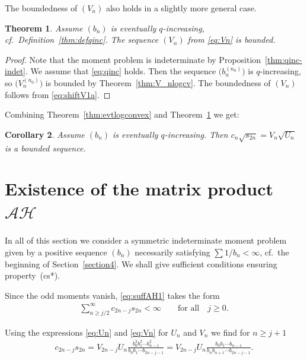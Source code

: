 \documentclass[11pt]{article}
\numberwithin{equation}{section}
\newtheorem{thm}{Theorem}[section]
\newtheorem{cor}[thm]{Corollary}
{ \theoremstyle{definition}
\newtheorem{defn}[thm]{Definition}
\newtheorem{ex}[thm]{Example}
 \newtheorem{rem}[thm]{Remark}}
\begin{document}
The boundedness of $(V_n)$ also holds in a slightly more general case.

\begin{thm}\label{thm:Vevtlogconv} Assume $(b_n)$ is eventually $q$-increasing, cf.\ Definition~{\rm \ref{thm:defqinc}}. The sequence $(V_n)$ from \eqref{eq:Vn} is bounded.
\end{thm}

\begin{proof} Note that the moment problem is indeterminate by Proposition~\ref{thm:qinc-indet}. We assume that \eqref{eq:qinc} holds. Then the sequence $\big(b_n^{(n_0)}\big)$ is $q$-increasing, so $\big(V_n^{(n_0)}\big)$ is bounded by Theorem~\ref{thm:V_nlogcv}. The boundedness of $(V_n)$ follows from \eqref{eq:shiftV1a}.
\end{proof}

Combining Theorem~\ref{thm:evtlogconvex} and Theorem~\ref{thm:Vevtlogconv} we get:

\begin{cor}\label{thm:VnsqrtUn} Assume $(b_n)$ is eventually $q$-increasing. Then $c_n\sqrt{s_{2n}}=V_n\sqrt{U_n}$ is a bounded sequence.
\end{cor}

\setcounter{section}{4}
\setcounter{subsection}{0}
\setcounter{subsubsection}{0}
\setcounter{thm}{11}
\setcounter{equation}{29}
\section[Existence of the matrix product $\mathcal A\mathcal H$]{Existence of the matrix product $\boldsymbol{\mathcal A\mathcal H}$}\label{section5}

In all of this section we consider a symmetric indeterminate moment problem given by a positive sequence $(b_n)$ necessarily satisfying $\sum 1/b_n<\infty$, cf.\ the beginning of Section~\ref{section4}. We shall give sufficient conditions ensuring property~(cs*).

Since the odd moments vanish, \eqref{eq:suffAH1} takes the form
\begin{gather}\label{eq:series}
\sum_{n\ge j/2}^\infty c_{2n-j}s_{2n}<\infty\qquad\text{for all}\quad j\ge 0.
\end{gather}

Using the expressions \eqref{eq:Un} and \eqref{eq:Vn} for $U_n$ and $V_n$ we find for $n\ge j+1$
 \begin{gather}\label{eq:UnVn}
c_{2n-j}s_{2n}= V_{2n-j}U_n\frac{b_0^2b_1^2\cdots b_{n-1}^2}{b_0b_1\cdots b_{2n-j-1}} =V_{2n-j}U_n\frac{b_0b_1\cdots b_{n-1}}{b_nb_{n+1}\cdots b_{2n-j-1}}.
\end{gather}
\end{document}
